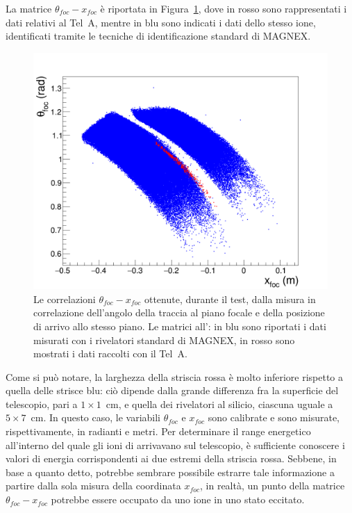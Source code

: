La matrice $\theta_{foc} - x_{foc}$ è riportata in Figura~\ref{fig:tefoc_xfoc2}, dove in rosso sono rappresentati i dati relativi al Tel~A, mentre in blu sono indicati i dati dello stesso ione, identificati tramite le tecniche di identificazione standard di MAGNEX.
\begin{figure} [!p]
	\centering
	\includegraphics[width=\textwidth, keepaspectratio]{Grafici_Tesi/Test/matrice_tefoc_xfoc.png}
	\caption{Le correlazioni $\theta_{foc} - x_{foc}$ ottenute, durante il test, dalla misura in correlazione dell'angolo della traccia al piano focale e della posizione di arrivo allo stesso piano. Le matrici all': in blu sono riportati i dati misurati con i rivelatori standard di MAGNEX, in rosso sono mostrati i dati raccolti con il Tel~A.} \label{fig:tefoc_xfoc2}
\end{figure}
Come si può notare, la larghezza della striscia rossa è molto inferiore rispetto a quella delle strisce blu: ciò dipende dalla grande differenza fra la superficie del telescopio, pari a $1 \times 1$~cm, e quella dei rivelatori al silicio, ciascuna uguale a $5 \times 7$~cm.
In questo caso, le variabili $\theta_{foc}$ e $x_{foc}$ sono calibrate e sono misurate, rispettivamente, in radianti e metri.
Per determinare il range energetico all'interno del quale gli ioni di  arrivavano sul telescopio, è sufficiente conoscere i valori di energia corrispondenti ai due estremi della striscia rossa.
Sebbene, in base a quanto detto, potrebbe sembrare possibile estrarre tale informazione a partire dalla sola misura della coordinata $x_{foc}$, in realtà, un punto della matrice $\theta_{foc} - x_{foc}$ potrebbe essere occupato da uno ione in uno stato eccitato.
